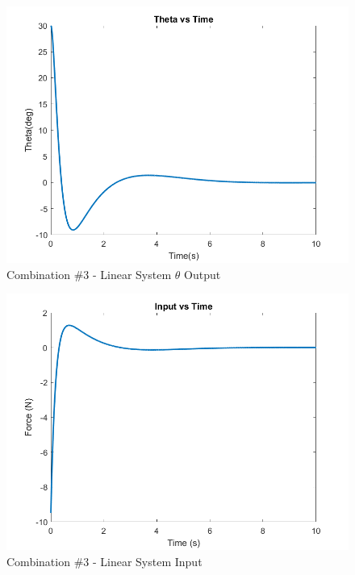 \begin{figure}[!ht]
    \centering
    \includegraphics[width=\linewidth]{figs/sf_lin_c3_theta.png}
    \caption{Combination $\#$3 - Linear System $\theta$ Output}
    \label{}
\end{figure}

\begin{figure}[!ht]
    \centering
    \includegraphics[width=\linewidth]{figs/sf_lin_c3_input.png}
    \caption{Combination $\#$3 - Linear System Input}
    \label{}
\end{figure}

